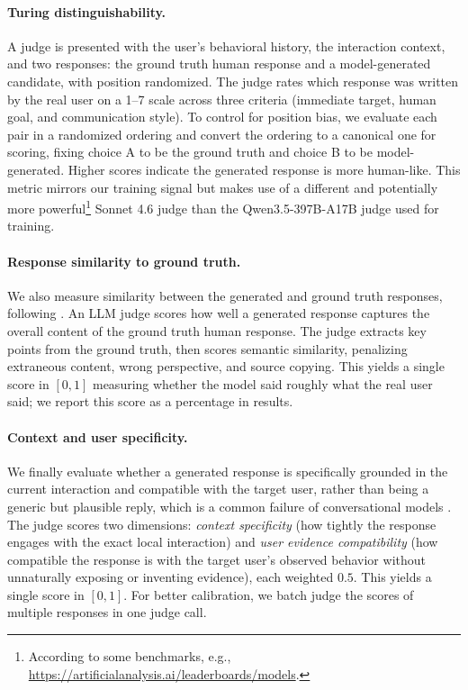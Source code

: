 \documentclass{article} %
\begin{document}
\paragraph{Turing distinguishability.}
 A judge is presented with the user's behavioral history, the interaction context, and two responses: the ground truth human response and a model-generated candidate, with position randomized. The judge rates which response was written by the real user on a 1--7 scale across three criteria (immediate target, human goal, and communication style). To control for position bias, we evaluate each pair in a randomized ordering and convert the ordering to a canonical one for scoring, fixing choice A to be the ground truth and choice B to be model-generated. Higher scores indicate the generated response is more human-like. This metric mirrors our training signal but makes use of a different and potentially more powerful\footnote{According to some benchmarks, e.g., \url{https://artificialanalysis.ai/leaderboards/models}.}   Sonnet 4.6 judge than the Qwen3.5-397B-A17B judge  used for training.

\paragraph{Response similarity to ground truth.} We also measure similarity between the generated and ground truth responses, following \citet{wu2026humanlm}.  An LLM judge scores how well a generated response captures the overall content of the ground truth human response. The judge extracts key points from the ground truth, then scores semantic similarity, penalizing extraneous content, wrong perspective, and source copying. This yields a single score in $[0, 1]$ measuring whether the model said roughly what the real user said; we report this score as a percentage in results.

\paragraph{Context and user specificity.}
We finally evaluate whether a generated response is specifically grounded in the current interaction and compatible with the target user, rather than being a generic but plausible reply, which is a common failure of conversational models \citep{li2016diversity, user_sim_survey}. The judge scores two dimensions: \emph{context specificity} (how tightly the response engages with the exact local interaction) and \emph{user evidence compatibility} (how compatible the response is with the target user's observed behavior without unnaturally exposing or inventing evidence), each weighted $0.5$. This yields a single score in $[0, 1]$. For better calibration, we batch judge the scores of multiple responses in one judge call.
\end{document}
